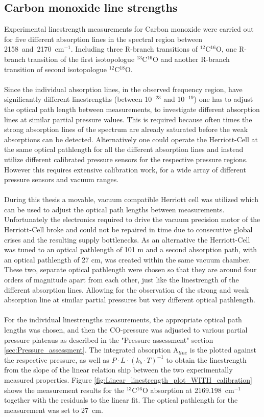 \subsection{Carbon monoxide line strengths}
Experimental linestrength measurements for Carbon monoxide were carried out for five different absorption lines in the spectral region between \mbox{2158 and 2170 cm$^{-1}$}. Including three R-branch transitions of $^{12}$C$^{16}$O, one R-branch transition of the first isotopologue $^{13}$C$^{16}$O and another R-branch transition of second isotopologue $^{12}$C$^{18}$O. \\\\
\noindent 
Since the individual absorption lines, in the observed frequency region, have significantly different linestrengths (between  10$^{-23}$ and 10$^{-19}$) one has to adjust the optical path length between measurements, to investigate different absorption lines at similar partial pressure values. This is required because often times the strong absorption lines of the spectrum are already saturated before the weak absorptions can be detected. Alternatively one could operate the Herriott-Cell at the same optical pathlength for all the different absorption lines and instead utilize different calibrated pressure sensors for the respective pressure regions. However this requires extensive calibration work, for a wide array of different pressure sensors and vacuum ranges. \\\\
\noindent
During this thesis a movable, vacuum compatible Herriott cell was utilized which can be used to adjust the optical path lengths between measurements. Unfortunately the electronics required to drive the vacuum precision motor of the Herriott-Cell broke and could not be repaired in time due to consecutive global crises and the resulting supply bottlenecks. As an alternative the Herriott-Cell was tuned to an optical pathlength of 101 m and a second absorption path, with an optical pathlength of 27 cm, was created within the same vacuum chamber. These two, separate optical pathlength were chosen so that they are around four orders of magnitude apart from each other, just like the linestrength of the different absorption lines. Allowing for the observation of the strong and weak absorption line at similar partial pressures but very different optical pathlength.\\\\
\noindent
For the individual linestrengths measurements, the appropriate optical path lengths was chosen, and then the CO-pressure was adjusted to various partial pressure plateaus as described in the "Pressure assessment" section  \ref{sec:Pressure_assessment}. The integrated absorption A$_{line}$ is the plotted against the respective pressure, as well as $P\cdot L \cdot (k_b \cdot T)^{-1}$ to obtain the linestrength from the slope of the linear relation ship between the two experimentally measured properties. Figure \ref{fig:Linear_linestrength_plot_WITH_calibration} shows the measurement results for the $^{13}$C$^{16}$O absorption at \mbox{2169.198 cm$^{-1}$} together with the residuals to the linear fit. The optical pathlength for the measurement was set to \mbox{27 cm}.
